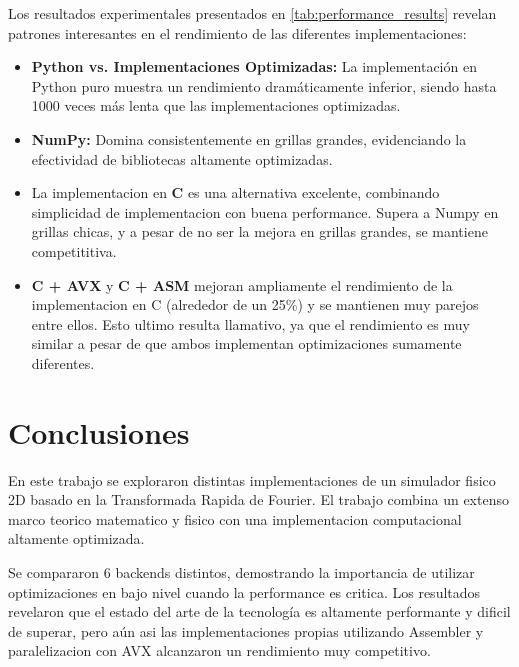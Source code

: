 \documentclass[a4paper]{article}
\begin{document}
Los resultados experimentales presentados en \ref{tab:performance_results} revelan patrones interesantes en el rendimiento de las diferentes implementaciones:
\begin{itemize}
    \item \textbf{Python vs. Implementaciones Optimizadas:} La implementación en Python puro muestra un rendimiento dramáticamente inferior, siendo hasta 1000 veces más lenta que las implementaciones optimizadas.

    \item \textbf{NumPy:} Domina consistentemente en grillas grandes, evidenciando la efectividad de bibliotecas altamente optimizadas.

    \item La implementacion en \textbf{C} es una alternativa excelente, combinando simplicidad de implementacion con buena performance. Supera a Numpy en grillas chicas, y a pesar de no ser la mejora en grillas grandes, se mantiene competititiva.

    \item \textbf{C + AVX} y \textbf{C + ASM} mejoran ampliamente el rendimiento de la implementacion en C (alrededor de un 25\%) y se mantienen muy parejos entre ellos. Esto ultimo resulta llamativo, ya que el rendimiento es muy similar a pesar de que ambos implementan optimizaciones sumamente diferentes.
\end{itemize}

\section{Conclusiones}
En este trabajo se exploraron distintas implementaciones de un simulador fisico 2D basado en la Transformada Rapida de Fourier. El trabajo combina un extenso marco teorico matematico y fisico con una implementacion computacional altamente optimizada.

Se compararon 6 backends distintos, demostrando la importancia de utilizar optimizaciones en bajo nivel cuando la performance es critica. Los resultados revelaron que el estado del arte de la tecnología es altamente performante y dificil de superar, pero aún asi las implementaciones propias utilizando Assembler y paralelizacion con AVX alcanzaron un rendimiento muy competitivo.
\printbibliography
\end{document}
